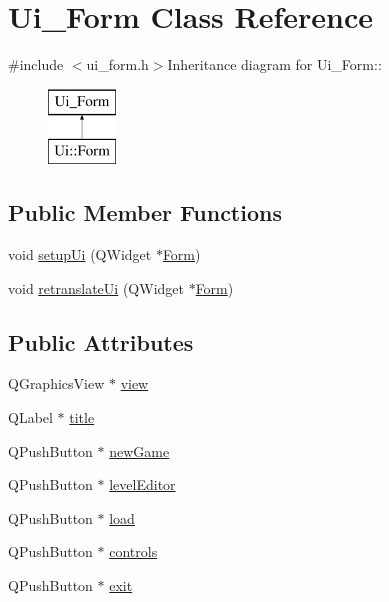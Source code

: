 \hypertarget{class_ui___form}{
\section{Ui\_\-Form Class Reference}
\label{class_ui___form}
}


{\ttfamily \#include $<$ui\_\-form.h$>$}Inheritance diagram for Ui\_\-Form::\begin{figure}[H]
\begin{center}
\leavevmode
\includegraphics[height=2cm]{class_ui___form}
\end{center}
\end{figure}
\subsection*{Public Member Functions}
\begin{DoxyCompactItemize}
\item 
void \hyperlink{class_ui___form_a90f69afe5c674331bdf041a051aee259}{setupUi} (QWidget $\ast$\hyperlink{class_form}{Form})
\item 
void \hyperlink{class_ui___form_ad05dfdbcadce5efd8a7e8da759e41aa4}{retranslateUi} (QWidget $\ast$\hyperlink{class_form}{Form})
\end{DoxyCompactItemize}
\subsection*{Public Attributes}
\begin{DoxyCompactItemize}
\item 
QGraphicsView $\ast$ \hyperlink{class_ui___form_a2dd20604b10943cf669cddf4ad73e2d1}{view}
\item 
QLabel $\ast$ \hyperlink{class_ui___form_a01632f0f69b650c6b495e36b16f6922d}{title}
\item 
QPushButton $\ast$ \hyperlink{class_ui___form_ae5ee8b7efe421103b41d2e290a3e5098}{newGame}
\item 
QPushButton $\ast$ \hyperlink{class_ui___form_aa3264d09b92887101ecdc97a9d062ece}{levelEditor}
\item 
QPushButton $\ast$ \hyperlink{class_ui___form_ae31e79a3a60f1e4995010ddc8b7dcff3}{load}
\item 
QPushButton $\ast$ \hyperlink{class_ui___form_a651e4b874f7a2909163b716c44d00ac9}{controls}
\item 
QPushButton $\ast$ \hyperlink{class_ui___form_a57a600065f00f810f6aca67828566765}{exit}
\end{DoxyCompactItemize}


